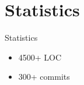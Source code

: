 \section{Statistics}

\begin{frame}{Statistics}
\begin{itemize}
	\item 4500+ LOC
	\item 300+ commits
\end{itemize}
\end{frame}
